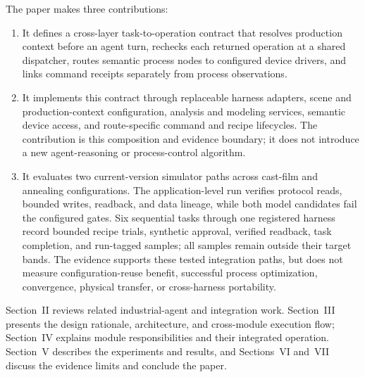 The paper makes three contributions:
\begin{enumerate}
\item It defines a cross-layer task-to-operation contract that resolves
  production context before an agent turn, rechecks each returned operation
  at a shared dispatcher, routes semantic process nodes to configured device
  drivers, and links command receipts separately from process observations.
\item It implements this contract through replaceable harness adapters,
  scene and production-context configuration, analysis and modeling
  services, semantic device access, and route-specific command and recipe
  lifecycles. The contribution is this composition and evidence boundary;
  it does not introduce a new agent-reasoning or process-control algorithm.
\item It evaluates two current-version simulator paths across cast-film and
  annealing configurations. The application-level run verifies protocol
  reads, bounded writes, readback, and data lineage, while both model
  candidates fail the configured gates. Six sequential tasks through one
  registered harness record bounded recipe trials, synthetic approval,
  verified readback, task completion, and run-tagged samples; all samples
  remain outside their target bands. The evidence supports these tested
  integration paths, but does not measure configuration-reuse benefit,
  successful process optimization, convergence, physical transfer, or
  cross-harness portability.
\end{enumerate}

Section~II reviews related industrial-agent and integration work.
Section~III presents the design rationale, architecture, and cross-module
execution flow; Section~IV explains module responsibilities and their
integrated operation. Section~V describes the experiments and results, and
Sections~VI and~VII discuss the evidence limits and conclude the paper.
